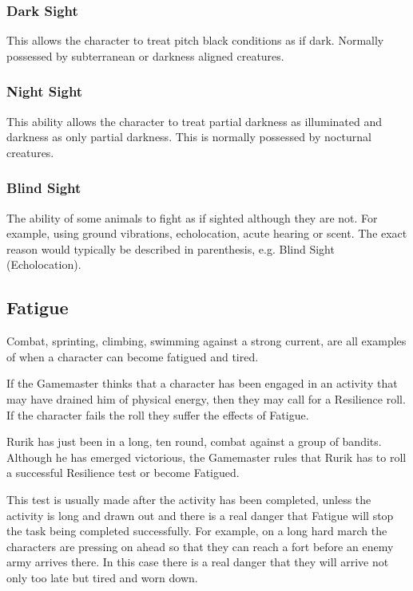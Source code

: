 \subsubsection{Dark Sight}
This allows the character to treat pitch black conditions as if dark. Normally possessed by subterranean or darkness aligned creatures.

\subsubsection{Night Sight}
This ability allows the character to treat partial darkness as illuminated and darkness as only partial darkness. This is normally possessed by nocturnal creatures.

\subsubsection{Blind Sight}
The ability of some animals to fight as if sighted although they are not. For example, using ground vibrations, echolocation, acute hearing or scent. The exact reason would typically be described in parenthesis, e.g. Blind Sight (Echolocation).


\subsection{Fatigue}
Combat, sprinting, climbing, swimming against a strong current, are all examples of when a character can become fatigued and tired.

If the Gamemaster thinks that a character has been engaged in an activity that may have drained him of physical energy, then they may call for a Resilience roll. If the character fails the roll they suffer the effects of Fatigue.

\begin{rpg-examplebox}
Rurik has just been in a long, ten round, combat against a group of bandits. Although he has emerged victorious, the Gamemaster rules that Rurik has to roll a successful Resilience test or become Fatigued.
\end{rpg-examplebox}

This test is usually made after the activity has been completed, unless the activity is long and drawn out and there is a real danger that Fatigue will stop the task being completed successfully. For example, on a long hard march the characters are pressing on ahead so that they can reach a fort before an enemy army arrives there. In this case there is a real danger that they will arrive not only too late but tired and worn down.

